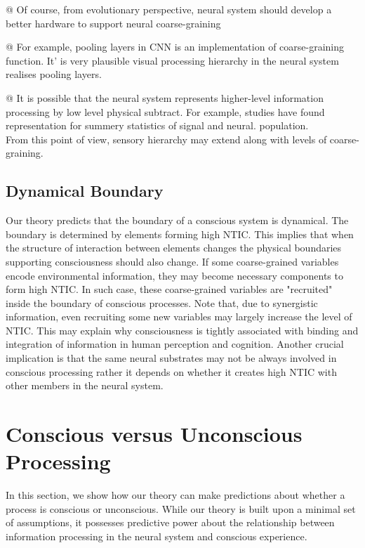 \documentclass[utf8]{article}
\begin{document}
            \begin{WritingMaterials}
    			@ Of course, from evolutionary perspective, neural system should develop a better hardware to support neural coarse-graining

				@ For example, pooling layers in CNN is an implementation of coarse-graining function. It' is very plausible visual processing hierarchy in the neural system realises pooling layers.


				@ It is possible that the neural system represents higher-level information processing by low level physical subtract. For example, studies have found representation for summery statistics of signal and neural. population.\\
				From this point of view, sensory hierarchy may extend along with levels of coarse-graining.
            \end{WritingMaterials}
        


        \subsection{Dynamical Boundary}
        Our theory predicts that the boundary of a conscious system is dynamical. The boundary is determined by elements forming high NTIC. This implies that when the structure of interaction between elements changes the physical boundaries supporting consciousness should also change. If some coarse-grained variables encode environmental information, they may become necessary components to form high NTIC. In such case, these coarse-grained variables are "recruited" inside the boundary of conscious processes. Note that, due to synergistic information, even recruiting some new variables may largely increase the level of NTIC. 
        This may explain why consciousness is tightly associated with binding and integration of information in human perception and cognition. Another crucial implication is that the same neural substrates may not be always involved in conscious processing rather it depends on whether it creates high NTIC with other members in the neural system. 
    
    
	\section{Conscious versus Unconscious Processing}\label{sec:Conscious versus Unconscious Processing}
	    In this section, we show how our theory can make predictions about whether a process is conscious or unconscious. While our theory is built upon a minimal set of assumptions, it possesses predictive power about the relationship between information processing in the neural system and conscious experience.
	    
\end{document}
